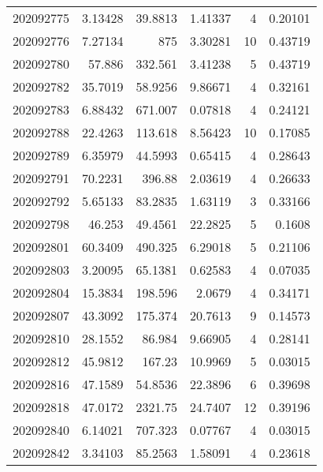 \begin{tabular}{rrrrrr}
 202092775 &          3.13428 &       39.8813 &            1.41337 &           4 & 0.20101 \\
 202092776 &          7.27134 &      875      &            3.30281 &          10 & 0.43719 \\
 202092780 &         57.886   &      332.561  &            3.41238 &           5 & 0.43719 \\
 202092782 &         35.7019  &       58.9256 &            9.86671 &           4 & 0.32161 \\
 202092783 &          6.88432 &      671.007  &            0.07818 &           4 & 0.24121 \\
 202092788 &         22.4263  &      113.618  &            8.56423 &          10 & 0.17085 \\
 202092789 &          6.35979 &       44.5993 &            0.65415 &           4 & 0.28643 \\
 202092791 &         70.2231  &      396.88   &            2.03619 &           4 & 0.26633 \\
 202092792 &          5.65133 &       83.2835 &            1.63119 &           3 & 0.33166 \\
 202092798 &         46.253   &       49.4561 &           22.2825  &           5 & 0.1608  \\
 202092801 &         60.3409  &      490.325  &            6.29018 &           5 & 0.21106 \\
 202092803 &          3.20095 &       65.1381 &            0.62583 &           4 & 0.07035 \\
 202092804 &         15.3834  &      198.596  &            2.0679  &           4 & 0.34171 \\
 202092807 &         43.3092  &      175.374  &           20.7613  &           9 & 0.14573 \\
 202092810 &         28.1552  &       86.984  &            9.66905 &           4 & 0.28141 \\
 202092812 &         45.9812  &      167.23   &           10.9969  &           5 & 0.03015 \\
 202092816 &         47.1589  &       54.8536 &           22.3896  &           6 & 0.39698 \\
 202092818 &         47.0172  &     2321.75   &           24.7407  &          12 & 0.39196 \\
 202092840 &          6.14021 &      707.323  &            0.07767 &           4 & 0.03015 \\
 202092842 &          3.34103 &       85.2563 &            1.58091 &           4 & 0.23618 \\

\end{tabular}
